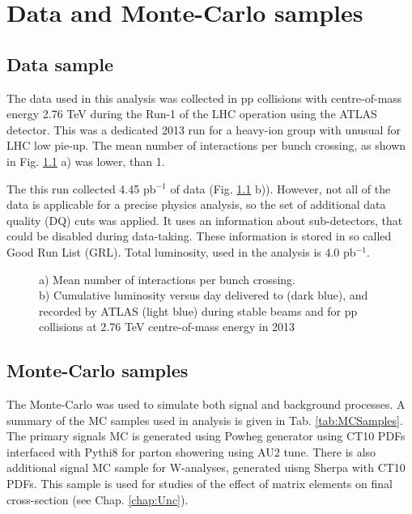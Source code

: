\chapter{Data and Monte-Carlo samples}
\section{Data sample}
The data used in this analysis was collected in pp collisions with centre-of-mass energy 2.76 TeV during the Run-1 of the LHC operation using the ATLAS detector. This was a dedicated 2013 run for a heavy-ion group with unusual for LHC low pie-up. The mean number of interactions per bunch crossing, as shown in Fig. \ref{ris:DataSampleMu} a) was lower, than 1. 

The this run \atlas collected 4.45 pb$^{-1}$ of data (Fig. \ref{ris:DataSampleMu} b)). However, not all of the data is applicable for a precise physics analysis, so the set of additional data quality (DQ) cuts was applied.  It uses an information about sub-detectors, that could be disabled during data-taking. These information is stored in so called Good Run List (GRL). Total luminosity, used in the analysis is 4.0 pb$^{-1}$. 

\begin{figure}[!b]
\begin{minipage}[h]{0.49\linewidth}
\end{minipage}
\hfill
\begin{minipage}[h]{0.49\linewidth}
\end{minipage}
\caption{a) Mean number of interactions per bunch crossing. \\
b) Cumulative luminosity versus day delivered to (dark blue), and recorded by ATLAS (light blue) during stable beams and for pp collisions at 2.76 TeV centre-of-mass energy in 2013}
\label{ris:DataSampleMu}
\end{figure}

\section{Monte-Carlo samples}

The Monte-Carlo was used to simulate both signal and background processes. A summary of the MC samples used in analysis is given in Tab. \ref{tab:MCSamples}. The primary signals MC is generated using Powheg generator using CT10\cite{NewPartonD} PDFs interfaced with Pythi8 for parton showering using AU2\cite{ATL-PHYS-PUB-2012-003} tune. There is also additional signal MC sample for W-analyses, generated uisng Sherpa with CT10 PDFs. This sample is used for studies of the effect of matrix elements on final cross-section (see Chap. \ref{chap:Unc}).

